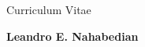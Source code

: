 \documentclass[a4paper]{article}
\begin{document}
\begin{center}

\begin{Large}
Curriculum Vitae
\end{Large}

\begin{small}
\textbf{Leandro E. Nahabedian}
\end{small}


\end{center}
\ddmmyyyydate


\end{document}
